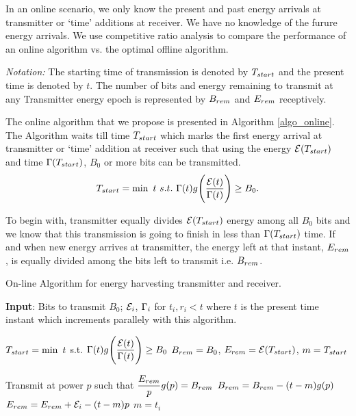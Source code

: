 In an online scenario, we only know the present and past energy arrivals at transmitter or `time' additions at receiver. We have no knowledge of the furure energy arrivals. We use competitive ratio analysis to compare the performance of an online algorithm vs. the optimal offline algorithm.  
 
\textit{Notation:} The starting time of transmission is denoted by $T_{\mbox{\scriptsize{start}}}$ and the present time is denoted by $t$. The number of bits and energy remaining to transmit at any Transmitter energy epoch is represented by $B_{\mbox{\scriptsize{rem}}}$ and $E_{\mbox{\scriptsize{rem}}}$ receptively.

The online algorithm that we propose is presented in Algorithm \ref{algo_online}. The Algorithm waits till time $T_{\mbox{\scriptsize{start}}}$ which marks the first energy arrival at transmitter or `time' addition at receiver such that using the energy $\ETx(T_{\mbox{\scriptsize{start}}})$ and time $\TRx(T_{\mbox{\scriptsize{start}}})$, $B_0$ or more bits can be transmitted.
\begin{equation}
T_{\mbox{\scriptsize{start}}}=\min\ t \ s.t.\  \TRx(t)g\Bigg{(} \dfrac{\ETx(t)}{\TRx(t)}\Bigg{)}\ge B_0.\label{online_T_start}
\end{equation}

To begin with, transmitter equally divides $\ETx(T_{\mbox{\scriptsize{start}}})$ energy among all $B_0$ bits and we know that this transmission is going to finish in less than $\TRx(T_{\mbox{\scriptsize{start}}})$ time. If and when new energy arrives at transmitter, the energy left at that instant, $E_{\mbox{\scriptsize{rem}}}$, is equally divided among the bits left to transmit i.e. $B_{\mbox{\scriptsize{rem}}}$.

\begin{algorithm}
\caption {On-line Algorithm for energy harvesting transmitter and receiver.}
\footnotesize
\label{algo_online}
\begin{algorithmic}[1]
\State \textbf{Input}: Bits to transmit $B_0$; $\mathcal{E}_i$, $\Gamma_i$ for $t_i,r_i<t$ where $t$ is the present time instant which increments parallely with this algorithm. 

\State $T_{\mbox{\scriptsize{start}}}=\min\ t$ s.t. $\Gamma(t)g\Bigg{(} \dfrac{\mathcal{E}(t)}{\Gamma(t)}\Bigg{)}\ge B_0$
\State $B_{\mbox{\scriptsize{rem}}}=B_0$, $E_{\mbox{\scriptsize{rem}}}=\ETx(T_{\mbox{\scriptsize{start}}})$, $m=T_{\mbox{\scriptsize{start}}}$

\Do
	\State Transmit at power $p$ such that $\dfrac{E_{\mbox{\scriptsize{rem}}}}{p} g(p)= B_{\mbox{\scriptsize{rem}}}$
		\State $B_{\mbox{\scriptsize{rem}}}=B_{\mbox{\scriptsize{rem}}}-(t-m)g(p)$
		\State $E_{\mbox{\scriptsize{rem}}}=E_{\mbox{\scriptsize{rem}}}+\ETx_i-(t-m)p$
		\State $m=t_i$
	\EndIf
{}
\end{algorithmic}
\end{algorithm}

